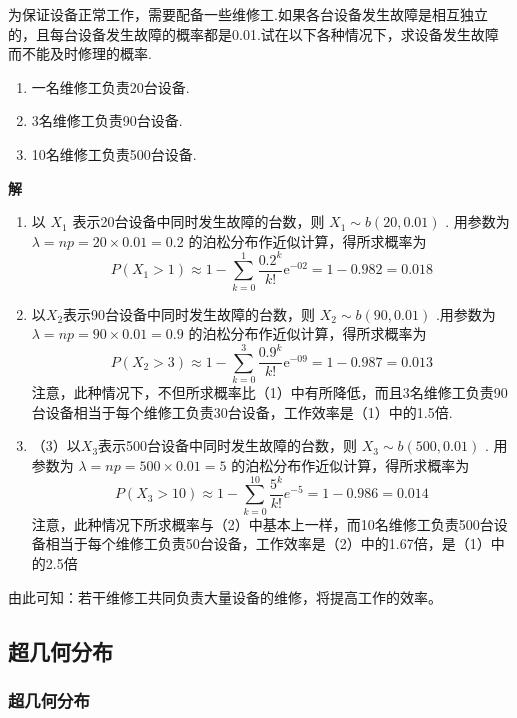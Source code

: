 \begin{example}
	为保证设备正常工作，需要配备一些维修工.如果各台设备发生故障是相互独立的，且每台设备发生故障的概率都是0.01.试在以下各种情况下，求设备发生故障而不能及时修理的概率.
	
	\begin{enumerate}
		\item 一名维修工负责20台设备.
		\item 3名维修工负责90台设备.
		\item 10名维修工负责500台设备.
	\end{enumerate}
	
	\textbf{解}
	\begin{enumerate}
		\item 以 $X_{1}$ 表示20台设备中同时发生故障的台数，则 $X_{1} \sim b(20,0.01)$ .
		用参数为 $\lambda=n p=20 \times 0.01=0.2$ 的泊松分布作近似计算，得所求概率为
		\[
		P\left(X_{1}>1\right) \approx 1-\sum_{k=0}^{1} \frac{0.2^{k}}{k !} \mathrm{e}^{-02}=1-0.982=0.018
		\]
		\item 以$ X_{2} $表示90台设备中同时发生故障的台数，则 $X_{2} \sim b(90,0.01)$ .用参数为 $\lambda=n p=90 \times 0.01=0.9$ 的泊松分布作近似计算，得所求概率为
		\[
		P\left(X_{2}>3\right) \approx 1-\sum_{k=0}^{3} \frac{0.9^{k}}{k !} \mathrm{e}^{-09}=1-0.987=0.013
		\]
		注意，此种情况下，不但所求概率比（1）中有所降低，而且3名维修工负责90台设备相当于每个维修工负责30台设备，工作效率是（1）中的1.5倍.
		\item 
		（3）以$ X_{3} $表示500台设备中同时发生故障的台数，则 $X_{3} \sim b(500,0.01)$ .
		用参数为 $\lambda=n p=500 \times 0.01=5$ 的泊松分布作近似计算，得所求概率为
		\[
		P\left(X_{3}>10\right) \approx 1-\sum_{k=0}^{10} \frac{5^{k}}{k !} e^{-5}=1-0.986=0.014
		\]
		注意，此种情况下所求概率与（2）中基本上一样，而10名维修工负责500台设备相当于每个维修工负责50台设备，工作效率是（2）中的1.67倍，是（1）中的2.5倍
	\end{enumerate}
	
	由此可知：若干维修工共同负责大量设备的维修，将提高工作的效率。
	
\end{example}

\subsection{超几何分布}

\subsubsection{超几何分布}

